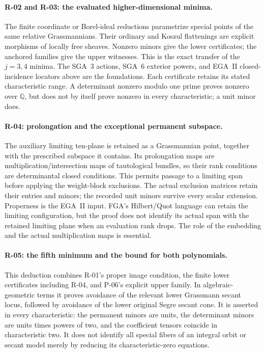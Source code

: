 \paragraph{R-02 and R-03: the evaluated higher-dimensional minima.}
The finite coordinate or Borel-ideal reductions parametrize
special points of the same relative Grassmannians.
Their ordinary and Koszul flattenings are explicit
morphisms of locally free sheaves. Nonzero minors give
the lower certificates; the anchored families give
the upper witnesses. This is the exact transfer of
the $j=3,4$ minima.
The SGA~3 actions, SGA~6 exterior powers, and EGA~II
closed-incidence locators above are the foundations.
Each certificate retains its stated characteristic
range. A determinant nonzero modulo one prime proves
nonzero over $\mathbb Q$, but does not by itself prove
nonzero in every characteristic; a unit minor does.

\paragraph{R-04: prolongation and the exceptional permanent subspace.}
The auxiliary limiting ten-plane is retained as a
Grassmannian point, together with the prescribed
subspace it contains. Its prolongation maps are
multiplication/intersection maps of tautological
bundles, so their rank conditions are determinantal
closed conditions. This permits passage to a limiting
span before applying the weight-block exclusions.
The actual exclusion matrices retain their entries
and minors; the recorded unit minors survive every
scalar extension. Properness is the EGA~II input.
FGA's Hilbert/Quot language can retain the limiting
configuration, but the proof does not identify its
actual span with the retained limiting plane when
an evaluation rank drops. The role of the embedding
and the actual multiplication maps is essential.

\paragraph{R-05: the fifth minimum and the bound for both polynomials.}
This deduction combines R-01's proper image condition,
the finite lower certificates including R-04, and
P-06's explicit upper family. In algebraic-geometric
terms it proves avoidance of the relevant lower
Grassmann secant locus, followed by avoidance of the
lower original Segre secant cone. It is asserted in
every characteristic: the permanent minors are units,
the determinant minors are units times powers of two,
and the coefficient tensors coincide in characteristic
two. It does not identify all
special fibers of an integral orbit or secant model
merely by reducing its characteristic-zero equations.

